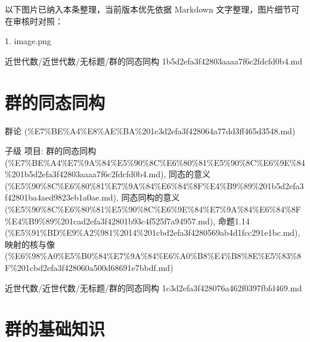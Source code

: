 \begin{note}[关联图片]
以下图片已纳入本条整理，当前版本优先依据 Markdown 文字整理，图片细节可在审核时对照：

1. image.png\\

\end{note}

\begin{note}[来源路径]

近世代数/近世代数/无标题/群的同态同构 1b5d2efa3f42803aaaa7f6c2fdcfd0b4.md

\end{note}

\section*{群的同态同构}

\begin{note}[来源上级主题]

群论 (\%E7\%BE\%A4\%E8\%AE\%BA\%201c3d2efa3f428064a77dd3ff465d3548.md)

\end{note}

\begin{note}[群的同态同构]

子级 项目: 群的同态同构 (\%E7\%BE\%A4\%E7\%9A\%84\%E5\%90\%8C\%E6\%80\%81\%E5\%90\%8C\%E6\%9E\%84\%201b5d2efa3f42803aaaa7f6c2fdcfd0b4.md), 同态的意义 (\%E5\%90\%8C\%E6\%80\%81\%E7\%9A\%84\%E6\%84\%8F\%E4\%B9\%89\%201b5d2efa3f42801ba4aed9823eb1a0ae.md), 同态同构的意义 (\%E5\%90\%8C\%E6\%80\%81\%E5\%90\%8C\%E6\%9E\%84\%E7\%9A\%84\%E6\%84\%8F\%E4\%B9\%89\%201cad2efa3f42801b93c4f525f7a94957.md), 命题1.14 (\%E5\%91\%BD\%E9\%A2\%981\%2014\%201cbd2efa3f4280569ab4d1fcc291e1bc.md), 映射的核与像 (\%E6\%98\%A0\%E5\%B0\%84\%E7\%9A\%84\%E6\%A0\%B8\%E4\%B8\%8E\%E5\%83\%8F\%201cbd2efa3f428060a500d68691e7bbdf.md)

\end{note}

\begin{note}[来源路径]

近世代数/近世代数/无标题/群的同态同构 1c3d2efa3f428076a462f0397fbfd469.md

\end{note}

\section*{群的基础知识}

